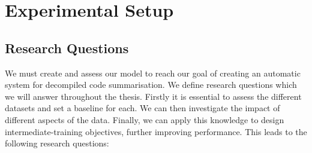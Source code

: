 \chapter{Experimental Setup}
\label{ExperimentalSetup}


\section{Research Questions}
We must create and assess our model to reach our goal of creating an automatic system for decompiled code summarisation. We define research questions which we will answer throughout the thesis. Firstly it is essential to assess the different datasets and set a baseline for each. We can then investigate the impact of different aspects of the data. Finally, we can apply this knowledge to design intermediate-training objectives, further improving performance. This leads to the following research questions:

